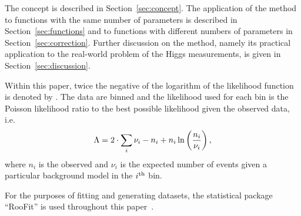 The concept is described in Section~\ref{sec:concept}.
The application of the method to functions with the same number of parameters
is described in Section~\ref{sec:functions} and to functions with different
numbers of parameters in Section~\ref{sec:correction}. Further discussion on
the method, namely its practical application to the real-world problem of
the Higgs measurements, is given in Section~\ref{sec:discussion}.

Within this paper, twice the negative of the logarithm of the likelihood
function is denoted by \nll. The data are binned and the
likelihood used for each bin is the Poisson likelihood ratio to the best
possible likelihood given the observed data, i.e.
\begin{equation}
\nll = 2\cdot\sum_{i} \nu_i - n_i + n_i \ln\left(\frac{n_i}{\nu_i}\right),
\label{eqn:introduction:def2NLL}
\end{equation}
where $n_{i}$ is the observed and $\nu_{i}$ is the expected number of events
given a particular background model in the $i^{\rm th}$ bin.

For the purposes of fitting and generating datasets, the statistical package
``RooFit'' is used throughout this paper~\cite{ref:roofit}.

